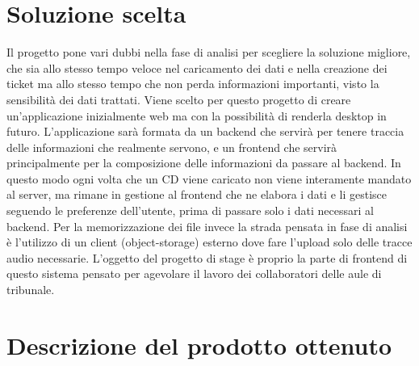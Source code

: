\section{Soluzione scelta}

Il progetto pone vari dubbi nella fase di analisi per scegliere la soluzione migliore, che sia allo stesso tempo veloce nel caricamento dei dati e nella creazione dei ticket ma allo
stesso tempo che non perda informazioni importanti, visto la sensibilità dei dati trattati. Viene scelto per questo progetto di creare un'applicazione inizialmente web ma con la possibilità
di renderla desktop in futuro. L'applicazione sarà formata da un backend che servirà per tenere traccia delle informazioni che realmente servono, e un frontend che servirà principalmente per la
composizione delle informazioni da passare al backend. In questo modo ogni volta che un CD viene caricato non viene interamente mandato al server, ma rimane in gestione
al frontend che ne elabora i dati e li gestisce seguendo le preferenze dell'utente, prima di passare solo i dati necessari al backend. Per la memorizzazione dei file invece
la strada pensata in fase di analisi è l'utilizzo di un client (object-storage) esterno dove fare l'upload solo delle tracce audio necessarie.
L'oggetto del progetto di stage è proprio la parte di frontend di questo sistema pensato per agevolare il lavoro dei collaboratori delle aule di tribunale.


\section{Descrizione del prodotto ottenuto}

